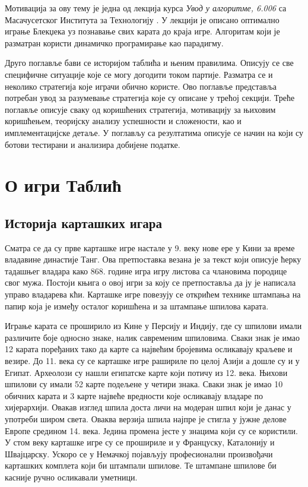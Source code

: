 \documentclass[a4paper, 12pt, ngerman]{article}
\let\oldsection\section
\renewcommand\section{\clearpage\oldsection}
\let\oldsubsection\subsection
\renewcommand\subsection{\clearpage\oldsubsection}
\newcommand{\quotesrb}[1]{\glqq#1\grqq}
\begin{document}
Мотивација за ову тему је једна од лекција курса \textit{Увод у алгоритме, 6.006} са Масачусетског Института за Технологију \cite{mit6006}. У лекцији је описано оптимално играње Блекџека уз познавање свих карата до краја игре. Алгоритам који је разматран користи динамичко програмирање као парадигму.

Друго поглавље бави се историјом таблића и њеним правилима. Описују се све специфичне ситуације које се могу догодити током партије. Разматра се и неколико стратегија које играчи обично користе. Ово поглавље представља потребан увод за разумевање стратегија које су описане у трећој секцији. Треће поглавље описује сваку од коришћених стратегија, мотивацију за њиховим коришћењем, теоријску анализу успешности и сложености, као и имплементацијске детаље. У поглављу са резултатима описује се начин на који су ботови тестирани и анализира добијене податке. 




\section{О игри Таблић}
\subsection{Историја карташких игара}
Сматра се да су прве карташке игре настале у 9. веку нове ере у Кини за време владавине династије Танг. Ова претпоставка везана је за текст који описује ћерку тадашњег владара како 868. године игра \quotesrb{игру листова} са члановима породице свог мужа. Постоји књига о овој игри за коју се претпоставља да ју је написала управо владарева кћи. Карташке игре повезују се открићем технике штампања на папир која је између осталог коришћена и за штампање шпилова карата.

Играње карата се проширило из Кине у Персију и Индију, где су шпилови имали различите боје односно знаке, налик савременим шпиловима. Сваки знак је имао 12 карата поређаних тако да карте са највећим бројевима осликавају краљеве и везире. До 11. века су се карташке игре рашириле по целој Азији а дошле су и у Египат. Археолози су нашли египатске карте који потичу из 12. века. Њихови шпилови су имали 52 карте подељене у четири знака. Сваки знак је имао 10 обичних карата и 3 карте највеће вредности које осликавају владаре по хијерархији. Овакав изглед шпила доста личи на модеран шпил који је данас у употреби широм света. Оваква верзија шпила најпре је стигла у јужне делове Европе средином 14. века. Једина промена јесте у знацима који су се користили. У стом веку карташке игре су се прошириле и у Француску, Каталонију и Швајцарску. Ускоро се у Немачкој појављују професионални произвођачи карташких комплета који би штампали шпилове. Те штампане шпилове би касније ручно осликавали уметници. 
\end{document}
